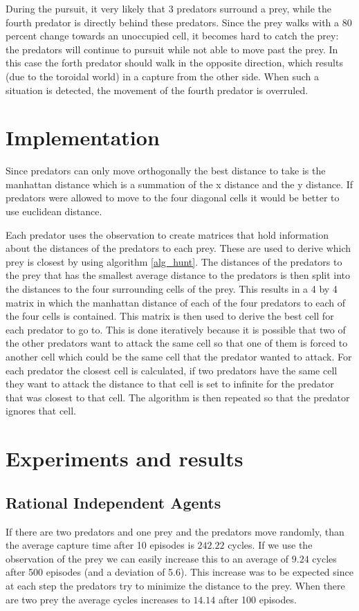 \documentclass[10pt]{article}
\begin{document}
During the pursuit, it very likely that 3 predators surround a prey, while the fourth predator is directly behind these predators. Since the prey walks with a 80 percent change towards an unoccupied cell, it becomes hard to catch the prey: the predators will continue to pursuit while not able to move past the prey. In this case the forth predator should walk in the opposite direction, which results (due to the toroidal world) in a capture from the other side. When such a situation is detected, the movement of the fourth predator is overruled.


\section{Implementation}\label{implementation}
Since predators can only move orthogonally the best distance to take is the manhattan distance which is a summation of the x distance and the y distance. If predators were allowed to move to the four diagonal cells it would be better to use euclidean distance. 

Each predator uses the observation to create matrices that hold information about the distances of the predators to each prey. These are used to derive which prey is closest by using algorithm \ref{alg_hunt}. The distances of the predators to the prey that has the smallest average distance to the predators is then split into the distances to the four surrounding cells of the prey. This results in a 4 by 4 matrix in which the manhattan distance of each of the four predators to each of the four cells is contained. This matrix is then used to derive the best cell for each predator to go to. This is done iteratively because it is possible that two of the other predators want to attack the same cell so that one of them is forced to another cell which could be the same cell that the predator wanted to attack. For each predator the closest cell is calculated, if two predators have the same cell they want to attack the distance to that cell is set to infinite for the predator that was closest to that cell. The algorithm is then repeated so that the predator ignores that cell.

\section{Experiments and results}\label{experiments}
\subsection{Rational Independent Agents}
If there are two predators and one prey and the predators move randomly, than the average capture time after 10 episodes is $242.22$ cycles. If we use the observation of the prey we can easily increase this to an average of $9.24$ cycles after 500 episodes (and a deviation of 5.6). This increase was to be expected since at each step the predators try to minimize the distance to the prey. When there are two prey the average cycles increases to $14.14$ after 100 episodes. 
\end{document}

